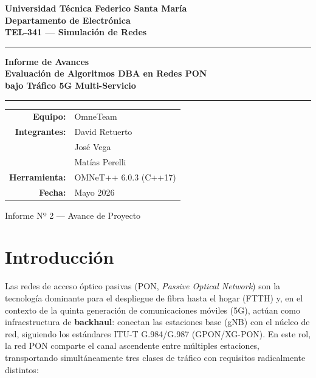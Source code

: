 \documentclass[12pt, letterpaper]{article}
\begin{document}
\begin{titlepage}
\centering
\vspace*{1cm}
{\Large\bfseries\color{azulUSM}
  Universidad Técnica Federico Santa María\\[0.3em]
  Departamento de Electrónica\\[0.3em]
  TEL-341 — Simulación de Redes
}\par
\vspace{1.5cm}
\rule{\textwidth}{1.5pt}\par
\vspace{0.6cm}
{\Huge\bfseries
  Informe de Avances\\[0.4em]
  \large\color{azulUSM}
  Evaluación de Algoritmos DBA en Redes PON\\
  bajo Tráfico 5G Multi-Servicio
}\par
\vspace{0.6cm}
\rule{\textwidth}{1.5pt}\par
\vspace{1.5cm}

\begin{tabular}{rl}
\textbf{Equipo:}      & OmneTeam \\[4pt]
\textbf{Integrantes:} & David Retuerto \\
                      & José Vega \\
                      & Matías Perelli \\[4pt]
\textbf{Herramienta:} & OMNeT++ 6.0.3 (C++17) \\[4pt]
\textbf{Fecha:}       & Mayo 2026 \\
\end{tabular}

\vfill
{\small Informe Nº 2 — Avance de Proyecto}
\end{titlepage}

\tableofcontents
\newpage

\section{Introducción}

Las redes de acceso óptico pasivas (PON, \textit{Passive Optical Network}) son la tecnología dominante para el despliegue de fibra hasta el hogar (FTTH) y, en el contexto de la quinta generación de comunicaciones móviles (5G), actúan como infraestructura de \textbf{backhaul}: conectan las estaciones base (gNB) con el núcleo de red, siguiendo los estándares ITU-T G.984/G.987 (GPON/XG-PON). En este rol, la red PON comparte el canal ascendente entre múltiples estaciones, transportando simultáneamente tres clases de tráfico con requisitos radicalmente distintos:
\end{document}

